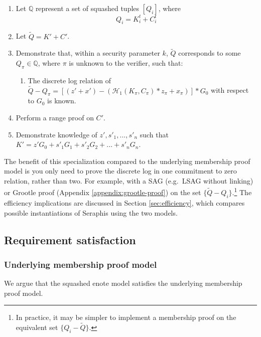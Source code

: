 \begin{appendices}
\begin{enumerate}
    \item Let $\mathbb{Q}$ represent a set of squashed tuples $[Q_i]$, where\vspace{.115cm}
    \[Q_i = K^t_i + C^t_i\]

    \item Let $\tilde{Q} = K' + C'$.

    \item Demonstrate that, within a security parameter $k$, $\tilde{Q}$ corresponds to some $Q_{\pi} \in \mathbb{Q}$, where $\pi$ is unknown to the verifier, such that:
    \begin{enumerate}
        \item The discrete log relation of $\tilde{Q} - Q_{\pi} = [(z' + x') - (\mathcal{H}_1(K_{\pi}, C_{\pi})*z_{\pi} + x_{\pi})]*G_0$ with respect to $G_0$ is known.
    \end{enumerate}

    \item Perform a range proof on $C'$.

    \item Demonstrate knowledge of $z', s'_1,...,s'_n$ such that $K' = z' G_0 + s'_1 G_1 + s'_2 G_2 + ... + s'_n G_n$.
\end{enumerate}

The benefit of this specialization compared to the underlying membership proof model is you only need to prove the discrete log in one commitment to zero relation, rather than two. For example, with a SAG (e.g.\ LSAG \cite{Liu2004} without linking) or Grootle proof (Appendix \ref{appendix:grootle-proof}) on the set $\{\tilde{Q} - Q_i\}$.\footnote{In practice, it may be simpler to implement a membership proof on the equivalent set $\{Q_i - \tilde{Q}\}$.} The efficiency implications are discussed in Section \ref{sec:efficiency}, which compares possible instantiations of Seraphis using the two models.


\subsection{Requirement satisfaction}
\label{appendix:squashed-enote-model-req-satisfaction}

\subsubsection{Underlying membership proof model}

We argue that the squashed enote model satisfies the underlying membership proof model.


\end{appendices}
